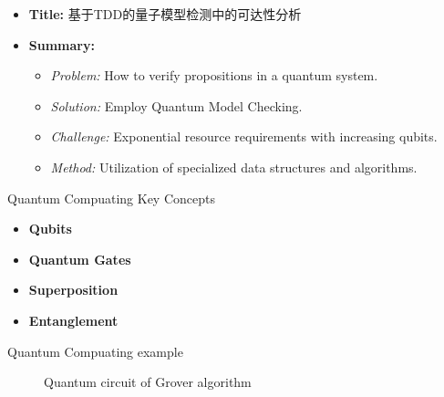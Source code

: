 \documentclass[aspectratio=1610]{beamer}
\begin{document}
\begin{frame}
    \begin{itemize}
        \item \textbf{Title:} 基于TDD的量子模型检测中的可达性分析
        \item \textbf{Summary:}
        \begin{itemize}
            \item \textit{Problem:} How to verify propositions in a quantum system.
            \item \textit{Solution:} Employ Quantum Model Checking.
            \item \textit{Challenge:} Exponential resource requirements with increasing qubits.
            \item \textit{Method:} Utilization of specialized data structures and algorithms.
        \end{itemize}
    \end{itemize}
\end{frame}
\begin{frame}{Quantum Compuating Key Concepts}
    \begin{itemize}[itemsep=18pt]
        \item \textbf{Qubits} 
        \item \textbf{Quantum Gates} 
        \item \textbf{Superposition} 
        \item \textbf{Entanglement}
    \end{itemize}
\end{frame}
\begin{frame}{Quantum Compuating example}
    \begin{figure}[h]
      \centering
      \caption{ Quantum circuit of Grover algorithm}
      \end{figure}
\end{frame}
\end{document}
